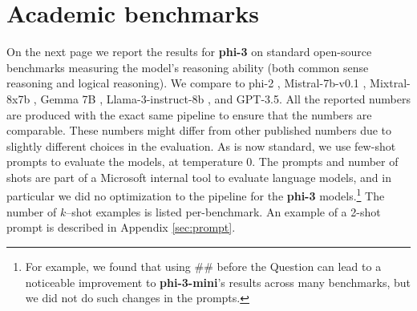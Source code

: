 \section{Academic benchmarks}

On the next page we report the results for \textbf{phi-3} on standard open-source benchmarks measuring the model's reasoning ability (both common sense reasoning and logical reasoning). We compare to phi-2 \cite{javaheripi2023phi}, Mistral-7b-v0.1 \cite{jiang2023mistral}, Mixtral-8x7b \cite{jiang2024mixtral}, Gemma 7B \cite{gemmateam2024gemma}, Llama-3-instruct-8b \cite{llama3}, and GPT-3.5. All the reported numbers are produced with the exact same pipeline to ensure that the numbers are comparable. These numbers might differ from other published numbers due to slightly different choices in the evaluation. As is now standard, we use few-shot prompts to evaluate the models, at temperature $0$. The prompts and number of shots are part of a Microsoft internal tool to evaluate language models, and in particular we did no optimization to the pipeline for the \textbf{phi-3} models.\footnote{For example, we found that using \#\# before the Question can lead to a noticeable improvement to \textbf{phi-3-mini}'s results across many benchmarks, but we did not do such changes in the prompts.} 
The number of $k$--shot examples is listed per-benchmark. 
An example of a 2-shot prompt is described in Appendix \ref{sec:prompt}.

